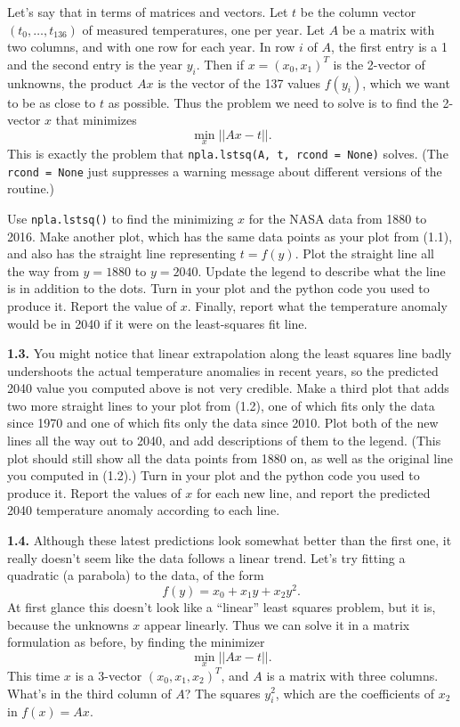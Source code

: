\documentclass[11pt]{article}
\begin{document}
Let's say that in terms of matrices and vectors.
Let $t$ be the column vector $(t_0,\ldots,t_{136})$ of measured temperatures,
one per year.
Let $A$ be a matrix with two columns, and with one row for each year.
In row $i$ of $A$, the first entry is a 1 and the second entry is the year $y_i$.
Then if $x=(x_0,x_1)^T$ is the 2-vector of unknowns, 
the product $Ax$ is the vector of the 137 values $f(y_i)$, which we want to be 
as close to $t$ as possible.
Thus the problem we need to solve is to find the 2-vector $x$ that minimizes
$$\min_x ||Ax - t||.$$
This is exactly the problem that {\tt npla.lstsq(A, t, rcond = None)} solves. 
(The {\tt rcond = None} just suppresses a warning message about different versions
of the routine.)

Use {\tt npla.lstsq()} to find the minimizing $x$ for the NASA data from 1880 to 2016.
Make another plot, which has the same data points as your plot from (1.1), 
and also has the straight line representing $t = f(y)$.
Plot the straight line all the way from $y=1880$ to $y=2040$.
Update the legend to describe what the line is in addition to the dots.
Turn in your plot and the python code you used to produce it.
Report the value of $x$.
Finally, report what the temperature anomaly would be in 2040 if it were on the least-squares fit line.

\par\medskip 
{\bf 1.3.}
You might notice that linear extrapolation along the least squares line badly undershoots the
actual temperature anomalies in recent years, so the predicted 2040 value you computed above
is not very credible.
Make a third plot that adds two more straight lines to your plot from (1.2),
one of which fits only the data since 1970 and one of which fits only the data since 2010.
Plot both of the new lines all the way out to 2040, and add descriptions of them to the legend.
(This plot should still show all the data points from 1880 on, 
as well as the original line you computed in (1.2).)
Turn in your plot and the python code you used to produce it.
Report the values of $x$ for each new line,
and report the predicted 2040 temperature anomaly according to each line.

\par\medskip 
{\bf 1.4.}
Although these latest predictions look somewhat better than the first one,
it really doesn't seem like the data follows a linear trend. 
Let's try fitting a quadratic (a parabola) to the data, of the form
$$f(y) = x_0 + x_1y + x_2y^2.$$
At first glance this doesn't look like a ``linear'' least squares problem,
but it is, because the unknowns $x$ appear linearly.
Thus we can solve it in a matrix formulation as before, by finding the minimizer
$$\min_x ||Ax - t||.$$
This time $x$ is a 3-vector $(x_0,x_1,x_2)^T$, and $A$ is a matrix with three columns.
What's in the third column of $A$? The squares $y_i^2$, 
which are the coefficients of $x_2$ in $f(x) = Ax$.
\end{document}
